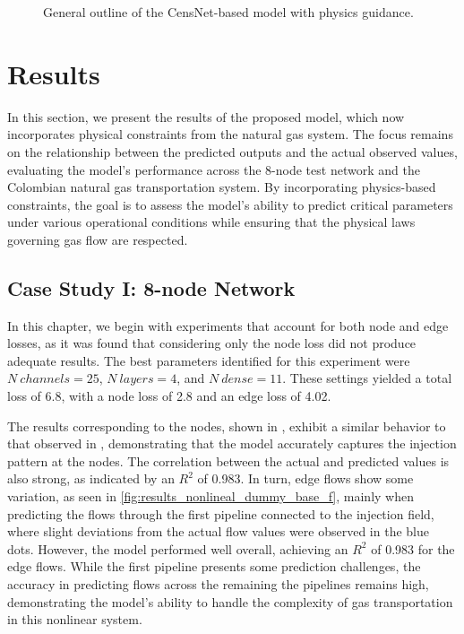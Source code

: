 \begin{figure}[h]
    \centering
    \setlength{}        
    \setlength{}
    \resizebox{\figurewidth}{\figureheight}{}
    \caption{General outline of the CensNet-based model with physics guidance.}
        \label{fig:nonlineal_model_description}
\end{figure}

\section{Results}


In this section, we present the results of the proposed model, which now incorporates physical constraints from the natural gas system. The focus remains on the relationship between the predicted outputs and the actual observed values, evaluating the model's performance across the 8-node test network and the Colombian natural gas transportation system. By incorporating physics-based constraints, the goal is to assess the model's ability to predict critical parameters under various operational conditions while ensuring that the physical laws governing gas flow are respected.

\subsection{Case Study I: 8-node Network}



In this chapter, we begin with experiments that account for both node and edge losses, as it was found that considering only the node loss did not produce adequate results. The best parameters identified for this experiment were $N \ channels=25$, $N \ layers =4$, and $N \ dense = 11$. These settings yielded a total loss of 6.8, with a node loss of 2.8 and an edge loss of 4.02.

The results corresponding to the nodes, shown in , exhibit a similar behavior to that observed in 
, demonstrating that the model accurately captures the injection pattern at the nodes. The correlation between the actual and predicted values is also strong, as indicated by an $R^2$ of 0.983. In turn, edge flows show some variation, as seen in \cref{fig:results_nonlineal_dummy_base_f}, mainly when predicting the flows through the first pipeline connected to the injection field, where slight deviations from the actual flow values were observed in the blue dots. However, the model performed well overall, achieving an $R^2$ of 0.983 for the edge flows. While the first pipeline presents some prediction challenges, the accuracy in predicting flows across the remaining the pipelines remains high, demonstrating the model's ability to handle the complexity of gas transportation in this nonlinear system.


